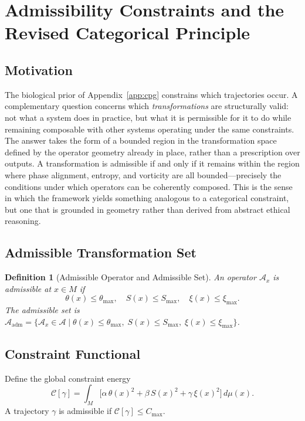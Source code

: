 \documentclass[12pt, a4paper]{article}
\newtheorem{definition}[theorem]{Definition}
\theoremstyle{remark}
\theoremstyle{definition}
\begin{document}
\section{Admissibility Constraints and the Revised Categorical Principle}
\label{app:admissibility}

\subsection{Motivation}

The biological prior of Appendix~\ref{app:cpg} constrains which trajectories occur.  A
complementary question concerns which \emph{transformations} are structurally valid: not
what a system does in practice, but what it is permissible for it to do while remaining
composable with other systems operating under the same constraints.  The answer takes the
form of a bounded region in the transformation space defined by the operator geometry
already in place, rather than a prescription over outputs.  A transformation is admissible
if and only if it remains within the region where phase alignment, entropy, and vorticity
are all bounded---precisely the conditions under which operators can be coherently composed.
This is the sense in which the framework yields something analogous to a categorical
constraint, but one that is grounded in geometry rather than derived from abstract ethical
reasoning.

\subsection{Admissible Transformation Set}

\begin{definition}[Admissible Operator and Admissible Set]
An operator $\mathcal{A}_x$ is \emph{admissible} at $x \in M$ if
\[
\theta(x) \le \theta_{\max}, \quad
S(x) \le S_{\max}, \quad
\xi(x) \le \xi_{\max}.
\]
The admissible set is
$\mathcal{A}_{\mathrm{adm}} = \{\mathcal{A}_x \in \mathcal{A} \mid \theta(x) \le
\theta_{\max},\; S(x) \le S_{\max},\; \xi(x) \le \xi_{\max}\}$.
\end{definition}

\subsection{Constraint Functional}

Define the global constraint energy
\[
\mathcal{C}[\gamma]
= \int_M \bigl[\alpha\,\theta(x)^2 + \beta\,S(x)^2 + \gamma\,\xi(x)^2\bigr]\,d\mu(x).
\]
A trajectory $\gamma$ is admissible if $\mathcal{C}[\gamma] \le C_{\max}$.
\end{document}
